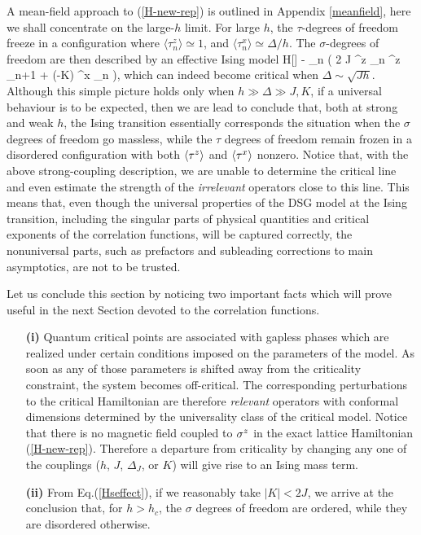 A mean-field approach to (\ref{H-new-rep}) is outlined
in Appendix \ref{meanfield}, here we shall concentrate
on the large-$h$ limit. 
For large $h$, the $\tau$-degrees of freedom freeze in a 
configuration where $\langle \tau^z_n\rangle \simeq 1$, and 
$\langle \tau^x_n\rangle \simeq \Delta/h$. The 
$\sigma$-degrees of freedom are then described by an effective 
Ising model 
\be
H[\s] \rightarrow - \sum_n \left( 2 J \s^z _n \s^z _{n+1} 
+ \left(-K\right) \s^x _n \right),
\label{Hseffect}
\ee
which 
can indeed become critical when $\Delta \sim \sqrt{Jh}$. Although 
this simple picture holds only when $h\gg \Delta \gg J,K$, 
if a universal behaviour is to be expected, then we are lead to conclude 
that, both at strong and weak $h$, the Ising transition essentially 
corresponds the situation when the $\sigma$ degrees of freedom go massless,
while the $\tau$ degrees of freedom remain frozen in a disordered 
configuration with both $\langle \tau^z \rangle$ and $\langle \tau^x \rangle$ 
nonzero.
Notice that, with the above strong-coupling description, 
we are unable to determine 
the critical line and even estimate the 
strength of the {\sl irrelevant} operators close to this line.   
This means that, even though the universal properties of the DSG model 
at the Ising transition, including the singular
parts of physical quantities and critical exponents of the correlation
functions, will be captured correctly, the nonuniversal parts, such as 
prefactors and subleading corrections to main asymptotics,
are not to be trusted. 

Let us conclude this section by noticing two 
important facts which will prove useful 
in the next Section devoted to the correlation functions.
\begin{itemize}
\item[{\bf (i)}]
Quantum critical points are associated with gapless phases which are
realized under certain conditions imposed on the parameters of
the model. As soon as any of those parameters
is shifted away from the criticality constraint,
the system becomes off-critical. The corresponding perturbations
to the critical Hamiltonian are therefore
{\sl relevant} operators with conformal dimensions
determined by the universality class of the critical model.
Notice that there is no magnetic field coupled to $\sigma^z$ in the exact
lattice Hamiltonian (\ref{H-new-rep}). Therefore a departure from
criticality by changing any one of the couplings ($h$, $J$,
$\Delta_J$,
or $K$) will give rise to an Ising mass term.

\item[{\bf (ii)}]
From Eq.(\ref{Hseffect}), if we reasonably take $|K|<2J$, we arrive at 
the conclusion that, for $h>h_c$, the $\sigma$ degrees of freedom 
are ordered, while they are disordered otherwise.
\end{itemize}


